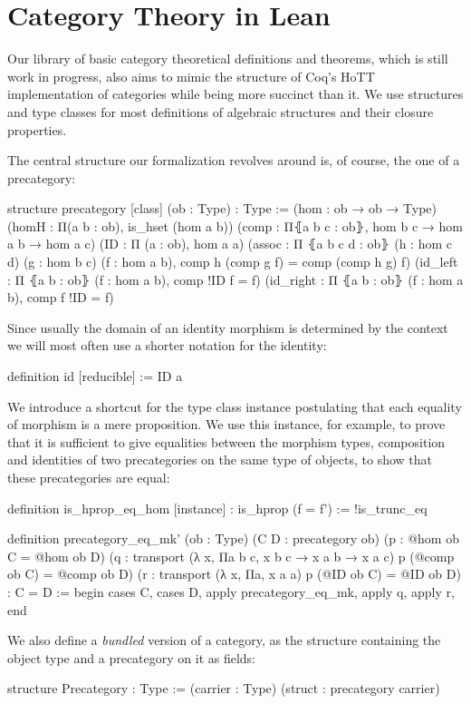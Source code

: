 \section{Category Theory in Lean}

Our library of basic category theoretical definitions and theorems, which is
still work in progress, also aims to mimic the structure of Coq's HoTT implementation
of categories while being more succinct than it.
We use structures and type classes for most definitions of algebraic structures
and their closure properties.

The central structure our formalization revolves around is, of course, the one
of a precategory:
\begin{leancode}
structure precategory [class] (ob : Type) : Type :=
  (hom : ob → ob → Type)
  (homH : Π(a b : ob), is_hset (hom a b))
  (comp : Π⦃a b c : ob⦄, hom b c → hom a b → hom a c)
  (ID : Π (a : ob), hom a a)
  (assoc : Π ⦃a b c d : ob⦄ (h : hom c d) (g : hom b c) (f : hom a b),
     comp h (comp g f) = comp (comp h g) f)
  (id_left : Π ⦃a b : ob⦄ (f : hom a b), comp !ID f = f)
  (id_right : Π ⦃a b : ob⦄ (f : hom a b), comp f !ID = f)
\end{leancode}

Since usually the domain of an identity morphism is determined by the context
we will most often use a shorter notation for the identity:
\begin{leancode}
definition id [reducible] := ID a
\end{leancode}

We introduce a shortcut for the type class instance postulating that each equality
of morphism is a mere proposition.
We use this instance, for example, to prove that it is sufficient to give equalities
between the morphism types, composition and identities of two precategories on the
same type of objects, to show that these precategories are equal:

\begin{leancode}
definition is_hprop_eq_hom [instance] : is_hprop (f = f') := !is_trunc_eq

definition precategory_eq_mk' (ob : Type) (C D : precategory ob)
  (p : @hom ob C = @hom ob D)
  (q : transport (λ x, Πa b c, x b c → x a b → x a c) p
    (@comp ob C) = @comp ob D)
  (r : transport (λ x, Πa, x a a) p (@ID ob C) = @ID ob D) : C = D :=
begin
  cases C, cases D,
  apply precategory_eq_mk, apply q, apply r,
end
\end{leancode}

We also define a \emph{bundled} version of a category, as the structure containing
the object type and a precategory on it as fields:
\begin{leancode}
structure Precategory : Type :=
  (carrier : Type)
  (struct : precategory carrier)
\end{leancode}

